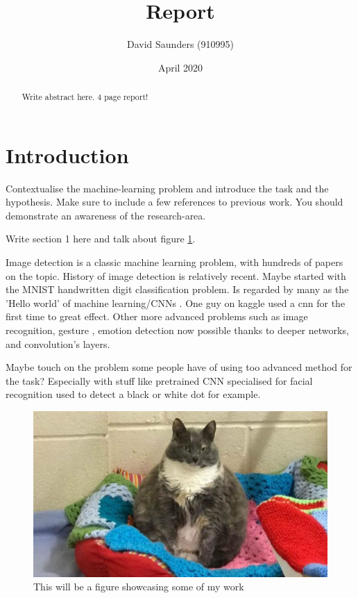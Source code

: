 \documentclass{article}
\title{Report}
\author{David Saunders (910995)}
\date{April 2020}
\begin{document}
\maketitle

\begin{abstract} 
    Write abstract here. 4 page report!
\end{abstract}

\tableofcontents

\section{Introduction}

Contextualise the machine-learning problem and introduce the
task and the hypothesis. Make sure to include a few references to previous
work. You should demonstrate an awareness of the research-area.

Write section 1 here \cite{torsney2011tuner} and talk about figure \ref{fig:test}.

Image detection is a classic machine learning problem, with hundreds of papers on the topic. 
History of image detection is relatively recent.
Maybe started with the MNIST handwritten digit classification problem.
Is regarded by many as the 'Hello world' of machine learning/CNNs \cite{tensorflow_2020}.
One guy on kaggle used a cnn for the first time to great effect.
Other more advanced problems such as image recognition, gesture
    , emotion detection now possible thanks to deeper networks, and convolution's layers.


Maybe touch on the problem some people have of using too advanced method for the task?
Especially with stuff like pretrained CNN specialised for facial recognition used to detect a black or white dot for example.


\begin{figure}[ht]
    \centering
    \includegraphics[scale=0.35]{Test.JPG}
    \caption{This will be a figure showcasing some of my work}
    \label{fig:test}
\end{figure}
\end{document}

